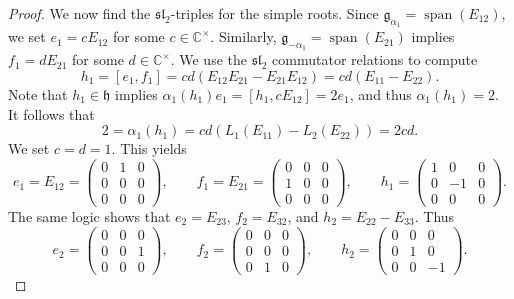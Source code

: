 \documentclass[11pt, letterpaper]{article}
\theoremstyle{plain}
\begin{document}
\begin{proof}
	We now find the $\mathfrak{sl} _2$-triples for the simple roots. Since $\mathfrak{g} _{\alpha _1} =\operatorname{span} (E_{12} )$, we set $e_1=cE_{12} $ for some $c\in\mathbb{C}^\times $. Similarly, $\mathfrak{g} _{-\alpha _1} =\operatorname{span} (E_{21} )$ implies $f_1 = dE_{21} $ for some $d\in\mathbb{C} ^{\times } $. We use the $\mathfrak{sl} _2$ commutator relations to compute
	\[
		h_1 = [e_1,f_1]=cd\left( E_{12} E_{21} -E_{21} E_{12}  \right) =cd\left( E_{11} -E_{22}  \right) 
	.\]
	Note that $h_1\in \mathfrak{h} $ implies $\alpha _1(h_1)e_1 = [h_1,cE_{12} ]=2e_1$, and thus $\alpha_1(h_1)=2$. It follows that
	\[
		2=\alpha _1(h_1) = cd\left(L_1(E_{11} ) - L_2(E_{22} )\right) = 2cd
	.\]
	We set $c=d=1$. This yields
	\[
		e_1 = E_{12} =\begin{pmatrix}
		0 & 1 & 0 \\
		0 & 0 & 0 \\
		0 & 0 & 0
		\end{pmatrix},\qquad f_1=E_{21} =\begin{pmatrix}
		0 & 0 & 0 \\
		1 & 0 & 0 \\
		0 & 0 & 0
		\end{pmatrix},\qquad h_1 = \begin{pmatrix}
		1 & 0 & 0 \\
		0 & -1 & 0 \\
		0 & 0 & 0
		\end{pmatrix}
	.\]
	The same logic shows that $e_2 = E_{23} $, $f_{2} =E_{32} $, and $h_2 = E_{22} -E_{33} $. Thus
	\[
		e_2 = \begin{pmatrix}
		0 & 0 & 0 \\
		0 & 0 & 1 \\
		0 & 0 & 0
		\end{pmatrix},\qquad f_2 = \begin{pmatrix}
		0 & 0 & 0 \\
		0 & 0 & 0 \\
		0 & 1 & 0
		\end{pmatrix},\qquad h_2 = \begin{pmatrix}
		0 & 0 & 0 \\
		0 & 1 & 0 \\
		0 & 0 & -1
		\end{pmatrix}
	.\]
	

\end{proof}
\end{document}
